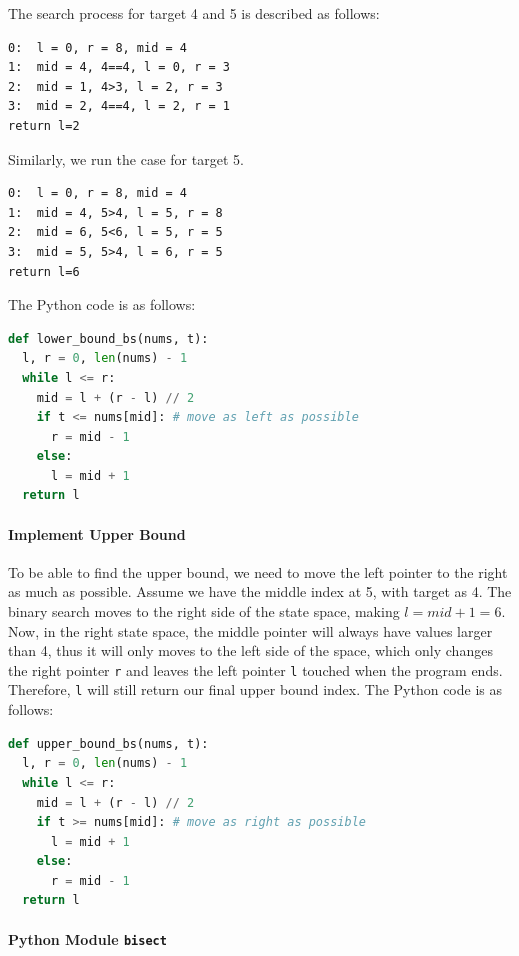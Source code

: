\documentclass[main.tex]{subfiles}
\begin{document}
The search process for target 4 and 5 is described as follows:
\begin{lstlisting}[numbers=none]
0:  l = 0, r = 8, mid = 4
1:  mid = 4, 4==4, l = 0, r = 3
2:  mid = 1, 4>3, l = 2, r = 3
3:  mid = 2, 4==4, l = 2, r = 1
return l=2
\end{lstlisting}
Similarly, we run the case for target 5. 
\begin{lstlisting}[numbers=none]
0:  l = 0, r = 8, mid = 4
1:  mid = 4, 5>4, l = 5, r = 8
2:  mid = 6, 5<6, l = 5, r = 5
3:  mid = 5, 5>4, l = 6, r = 5
return l=6
\end{lstlisting}
The Python code is as follows:
\begin{lstlisting}[language=Python]
def lower_bound_bs(nums, t):
  l, r = 0, len(nums) - 1
  while l <= r:
    mid = l + (r - l) // 2
    if t <= nums[mid]: # move as left as possible
      r = mid - 1
    else:
      l = mid + 1
  return l
\end{lstlisting}
\paragraph{Implement Upper Bound} To be able to find the upper bound, we need to move the left pointer to the right as much as possible. Assume we have the middle index at 5, with target as 4. The binary search moves  to the right side of the state space, making $l=mid+1=6$. Now, in the right state space, the middle pointer will always have values larger than 4, thus it will only moves to the left side of the space, which only changes the right pointer \texttt{r} and leaves the left pointer \texttt{l} touched when the program ends. Therefore, \texttt{l} will still return our final upper bound index.  The Python code is as follows:
\begin{lstlisting}[language=Python]
def upper_bound_bs(nums, t):
  l, r = 0, len(nums) - 1
  while l <= r:
    mid = l + (r - l) // 2
    if t >= nums[mid]: # move as right as possible
      l = mid + 1
    else:
      r = mid - 1
  return l
\end{lstlisting}


\paragraph{Python Module \texttt{bisect}}
\end{document}
